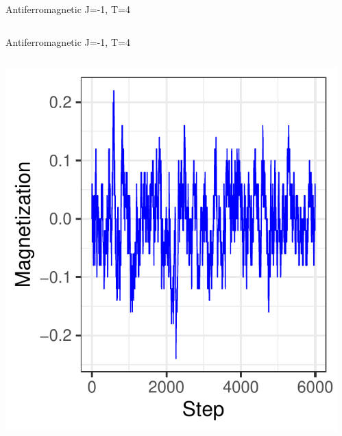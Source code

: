\documentclass{beamer}
\begin{document}
\begin{frame}{Antiferromagnetic J=-1, T=4}
\begin{columns}
\begin{column}{0.5\textwidth}
\begin{center}
     \end{center}
\end{column}
\end{columns}
\end{frame}

\begin{frame}{Antiferromagnetic J=-1, T=4}
\begin{columns}
\begin{column}{0.5\textwidth}
    \begin{center}
     \includegraphics[width=\textwidth]{Pic/J-1_60_2500_T=4_Magnetization.pdf}
     \end{center}
\end{column}
\begin{column}{0.5\textwidth}
    \begin{center}

\end{center}
\end{column}
\end{columns}
\end{frame}
\end{document}
